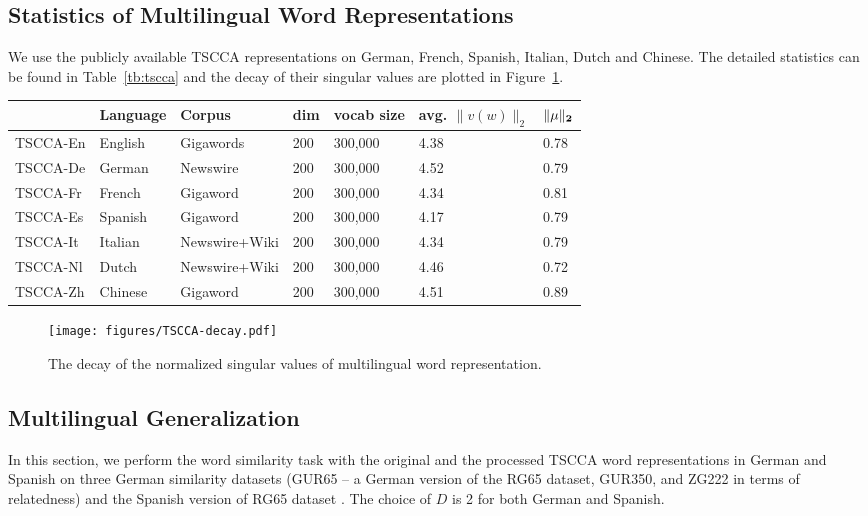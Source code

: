 \documentclass{article} \usepackage{acl2017,times}
\begin{document}
\subsection{Statistics of Multilingual Word Representations}
We use the publicly available TSCCA representations \citep{dhillon2012two} on German, French, Spanish, Italian, Dutch and Chinese. The detailed statistics can be found in Table~\ref{tb:tscca} and the decay of their singular values are plotted in Figure~\ref{fig:tscca-decay}.

\begin{table*}[!h]
\begin{center}
\begin{tabular}{|l|l|l|l|l|l|l|}
\hline
 &  \bf Language &  \bf Corpus &  \bf dim &  \bf vocab size &  \bf avg. $\|v(w)\|_2$ &  $\bf \|\mu\|_2$\\
\hline
TSCCA-En & English & Gigawords & 200 & 300,000 & 4.38 & 0.78 \\
TSCCA-De & German & Newswire & 200 & 300,000 & 4.52 & 0.79 \\
TSCCA-Fr & French & Gigaword & 200 & 300,000 & 4.34 & 0.81 \\
TSCCA-Es & Spanish & Gigaword & 200 & 300,000 & 4.17 & 0.79 \\
TSCCA-It & Italian & Newswire+Wiki & 200 & 300,000 & 4.34 & 0.79 \\
TSCCA-Nl & Dutch & Newswire+Wiki & 200 & 300,000 & 4.46 & 0.72 \\
TSCCA-Zh & Chinese & Gigaword & 200 & 300,000 & 4.51 & 0.89 \\
\hline 
\end{tabular}
\end{center}
\caption{A detailed description for the TSCCA embeddings in this paper.}
\label{tb:tscca}
\end{table*}


\begin{figure}[!h]
  \centering
  {
  \texttt{[image: figures/TSCCA-decay.pdf]}
  }
  \caption{The decay of the normalized singular values of multilingual word representation.}
  \label{fig:tscca-decay}
\end{figure}


\subsection{Multilingual Generalization }
\label{app:multilingual}

In this section, we perform the word similarity task with the original and the processed TSCCA word representations in German and Spanish on three German similarity datasets (GUR65 -- a German version of the RG65 dataset, GUR350, and ZG222 in terms of relatedness) \citep{zesch2006automatically} and the Spanish version of  RG65 dataset \citep{camacho2015framework}.  The choice of $D$ is 2 for both German and Spanish.
\end{document}
